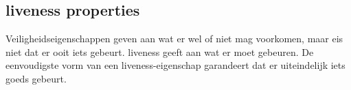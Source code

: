 \documentclass{article}
\begin{document}
	\subsection{liveness properties}
	Veiligheidseigenschappen geven aan wat er wel of niet mag voorkomen,
	maar eis niet dat er ooit iets gebeurt. liveness geeft aan wat er moet gebeuren. De eenvoudigste vorm van een liveness-eigenschap garandeert dat er uiteindelijk iets goeds gebeurt.
	
	
	
	
	
	
	
	
	
	
	
	
	
	
	
\end{document}
